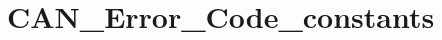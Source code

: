\hypertarget{group___c_a_n___error___code__constants}{\section{C\-A\-N\-\_\-\-Error\-\_\-\-Code\-\_\-constants}
\label{group___c_a_n___error___code__constants}
}
